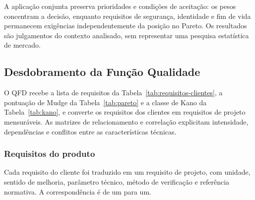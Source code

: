 A aplicação conjunta preserva prioridades e condições de aceitação: os pesos concentram a decisão, enquanto requisitos de segurança, identidade e fim de vida permanecem exigências independentemente da posição no Pareto. Os resultados são julgamentos do contexto analisado, sem representar uma pesquisa estatística de mercado.


\subsection{Desdobramento da Função Qualidade}

O QFD recebe a lista de requisitos da Tabela~\ref{tab:requisitos-clientes}, a pontuação de Mudge da Tabela~\ref{tab:pareto} e a classe de Kano da Tabela~\ref{tab:kano}, e converte os requisitos dos clientes em requisitos de projeto mensuráveis. As matrizes de relacionamento e correlação explicitam intensidade, dependências e conflitos entre as características técnicas.

\subsubsection{Requisitos do produto}

Cada requisito do cliente foi traduzido em um requisito de projeto, com unidade, sentido de melhoria, parâmetro técnico, método de verificação e referência normativa. A correspondência é de um para um.


